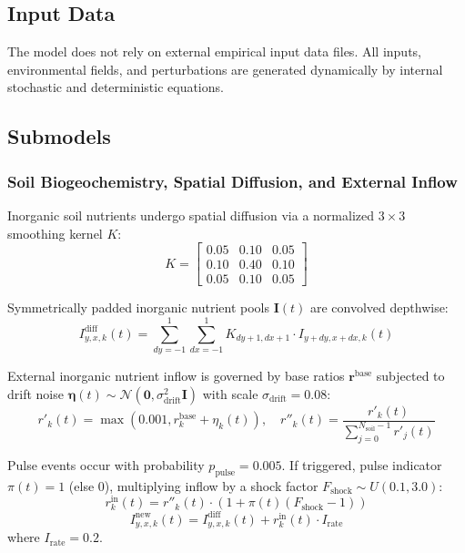 \documentclass[11pt,a4paper]{article}
\begin{document}
\subsection{Input Data}
The model does not rely on external empirical input data files. All inputs, environmental fields, and perturbations are generated dynamically by internal stochastic and deterministic equations.

\subsection{Submodels}

\subsubsection{Soil Biogeochemistry, Spatial Diffusion, and External Inflow}
Inorganic soil nutrients undergo spatial diffusion via a normalized $3 \times 3$ smoothing kernel $K$:
\begin{equation}
K = \begin{bmatrix} 0.05 & 0.10 & 0.05 \\ 0.10 & 0.40 & 0.10 \\ 0.05 & 0.10 & 0.05 \end{bmatrix}
\end{equation}

Symmetrically padded inorganic nutrient pools $\mathbf{I}(t)$ are convolved depthwise:
\begin{equation}
I^{\text{diff}}_{y,x,k}(t) = \sum_{dy=-1}^{1} \sum_{dx=-1}^{1} K_{dy+1, dx+1} \cdot I_{y+dy, x+dx, k}(t)
\end{equation}

External inorganic nutrient inflow is governed by base ratios $\boldsymbol{r}^{\text{base}}$ subjected to drift noise $\boldsymbol{\eta}(t) \sim \mathcal{N}(\boldsymbol{0}, \sigma_{\text{drift}}^2 \mathbf{I})$ with scale $\sigma_{\text{drift}} = 0.08$:
\begin{equation}
r'_k(t) = \max\left(0.001, r^{\text{base}}_k + \eta_k(t)\right), \quad r''_k(t) = \frac{r'_k(t)}{\sum_{j=0}^{N_{\text{soil}}-1} r'_j(t)}
\end{equation}

Pulse events occur with probability $p_{\text{pulse}} = 0.005$. If triggered, pulse indicator $\pi(t)=1$ (else $0$), multiplying inflow by a shock factor $F_{\text{shock}} \sim U(0.1, 3.0)$:
\begin{equation}
r^{\text{in}}_k(t) = r''_k(t) \cdot \left(1 + \pi(t) (F_{\text{shock}} - 1)\right)
\end{equation}
\begin{equation}
I^{\text{new}}_{y,x,k}(t) = I^{\text{diff}}_{y,x,k}(t) + r^{\text{in}}_k(t) \cdot I_{\text{rate}}
\end{equation}
where $I_{\text{rate}} = 0.2$.
\end{document}
